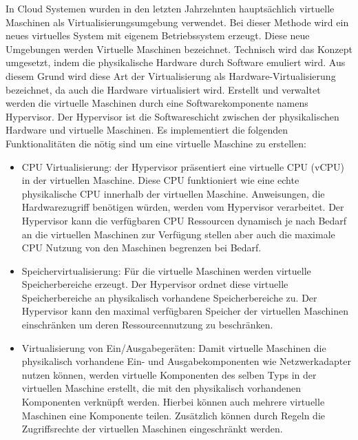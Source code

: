 In Cloud Systemen wurden in den letzten Jahrzehnten hauptsächlich virtuelle Maschinen als Virtualisierungsumgebung verwendet. Bei dieser Methode wird ein neues virtuelles System mit eigenem Betriebssystem erzeugt. Diese neue Umgebungen werden Virtuelle Maschinen bezeichnet. \cite{Pahl2015} Technisch wird das Konzept umgesetzt, indem die physikalische Hardware durch Software emuliert wird. Aus diesem Grund wird diese Art der Virtualisierung als Hardware-Virtualisierung bezeichnet, da auch die Hardware virtualisiert wird. Erstellt und verwaltet werden die virtuelle Maschinen durch eine Softwarekomponente namens Hypervisor. Der Hypervisor ist die Softwareschicht zwischen der physikalischen Hardware und virtuelle Maschinen. Es implementiert die folgenden Funktionalitäten die nötig sind um eine virtuelle Maschine zu erstellen:
\begin{itemize}
	\item CPU Virtualisierung: der Hypervisor präsentiert eine virtuelle CPU (vCPU) in der virtuellen Maschine. Diese CPU funktioniert wie eine echte physikalische CPU innerhalb der virtuellen Maschine. Anweisungen, die Hardwarezugriff benötigen würden, werden vom Hypervisor verarbeitet. Der Hypervisor kann die verfügbaren CPU Ressourcen dynamisch je nach Bedarf an die virtuellen Maschinen zur Verfügung stellen aber auch die maximale CPU Nutzung von den Maschinen begrenzen bei Bedarf. 
	\item Speichervirtualisierung: Für die virtuelle Maschinen werden virtuelle Speicherbereiche erzeugt. Der Hypervisor ordnet diese virtuelle Speicherbereiche an physikalisch vorhandene Speicherbereiche zu. Der Hypervisor kann den maximal verfügbaren Speicher der virtuellen Maschinen einschränken um deren Ressourcennutzung zu beschränken.
	\item Virtualisierung von Ein/Ausgabegeräten: Damit virtuelle Maschinen die physikalisch vorhandene Ein- und Ausgabekomponenten wie Netzwerkadapter nutzen können, werden virtuelle Komponenten des selben Typs in der virtuellen Maschine erstellt, die mit den physikalisch vorhandenen Komponenten verknüpft werden. Hierbei können auch mehrere virtuelle Maschinen eine Komponente teilen. Zusätzlich können durch Regeln die Zugriffsrechte der virtuellen Maschinen eingeschränkt werden.  \cite{Dall2014}
\end{itemize}
